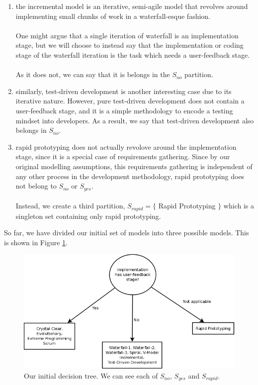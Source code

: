 \begin{enumerate}
  \item the incremental model is an iterative, semi-agile model that revolves
  around implementing small chunks of work in a waterfall-esque fashion.\\
  \\
  One might argue that a single iteration of waterfall is an implementation stage,
  but we will choose to instead say that the implementation or coding stage of
  the waterfall iteration is the task which needs a user-feedback stage.\\
  \\
  As it does not, we can say that it is belongs in the $S_{no}$ partition.
  \item similarly, test-driven development is another interesting case due to
  its iterative nature.
  However, pure test-driven development does not contain a user-feedback stage,
  and it is a simple methodology to encode a testing mindset into developers.
  As a result, we say that test-driven development also belongs in $S_{no}$.
  \item rapid prototyping does not actually revolove around the implementation
  stage, since it is a special case of requirements gathering.
  Since by our original modelling assumptions, this requirements gathering is
  independent of any other process in the development methodology, rapid
  prototyping does not belong to $S_{no}$ or $S_{yes}$.\\
  \\
  Instead, we create a third partition, $S_{rapid} = \{$ Rapid Prototyping $\}$ which is a singleton set
  containing only rapid prototyping.
\end{enumerate}

So far, we have divided our initial set of models into three possible models.
This is shown in Figure \ref{DecTree1}.

\begin{figure}[ht!]
  \includegraphics[scale=0.4]{media/DecisionTree1}
  \caption{Our initial decision tree. We can see each of $S_{no}$, $S_{yes}$ and $S_{rapid}$.}
  \label{DecTree1}
\end{figure}

